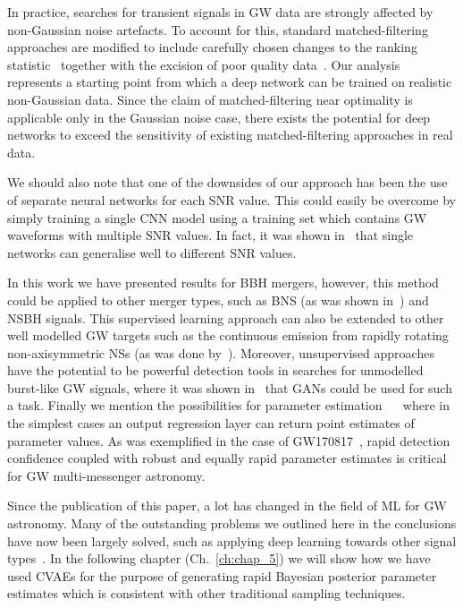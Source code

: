 %
%
In practice, searches for transient signals in \ac{GW} data are strongly 
affected by non-Gaussian noise artefacts. To account for this, 
standard matched-filtering approaches are modified to include 
carefully chosen changes to the ranking
statistic~\cite{PhysRevD.71.062001,0004-637X-849-2-118} together with 
the excision of poor quality data~\cite{1710.02185, 0264-9381-33-13-134001}. 
Our analysis represents a starting point from which a deep network 
can be trained on realistic non-Gaussian data. Since the 
claim of matched-filtering near optimality is applicable only in the 
Gaussian noise case, there exists the potential for deep networks 
to exceed the sensitivity of existing matched-filtering 
approaches in real data.

%
%
We should also note that one of the downsides of our 
approach has been the use of separate 
neural networks for each \ac{SNR} value. This could easily 
be overcome by simply training a single \ac{CNN} model using a training set 
which contains \ac{GW} waveforms with multiple \ac{SNR} values. In fact, 
it was shown in~\cite{PhysRevD.100.044009} that single networks can generalise 
well to different \ac{SNR} values. 

%
%
In this work we have presented results for \ac{BBH} mergers, however, 
this method could be applied to other merger types, such as 
\ac{BNS} (as was shown in~\cite{PhysRevD.102.063015,KRASTEV2020135330}) 
and \ac{NSBH} signals. 
This supervised learning approach can 
also be extended to other well modelled \ac{GW} targets such as the 
continuous emission from rapidly rotating non-axisymmetric \ac{NS}s (as 
was done by~\cite{PhysRevD.100.044009}). Moreover, unsupervised 
approaches have the potential to be powerful detection tools in 
searches for unmodelled burst-like \ac{GW} signals, where it was 
shown in~\cite{2021CQGra..38o5005M} that \acp{GAN} could be 
used for such a task. Finally we 
mention the possibilities for parameter estimation~\cite{GEORGE201864}
~ where 
in the simplest cases an output regression layer can return 
point estimates of parameter values. As was exemplified in the 
case of GW170817~\cite{PhysRevLett.119.161101}, rapid detection confidence 
coupled with robust and equally rapid parameter estimates is 
critical for \ac{GW} multi-messenger astronomy. 

%
%
Since the publication of this paper, a lot has changed in the field of 
\ac{ML} for \ac{GW} astronomy. Many of the outstanding problems we outlined 
here in the conclusions have now been largely solved, such as applying 
deep learning towards other signal types~\cite{KRASTEV2020135330,PhysRevD.102.063015,2021CQGra..38o5005M,2021arXiv210513664B,Cuoco_2020}.
In the following chapter 
(Ch.~\ref{ch:chap_5}) we will show how we have used \acp{CVAE} for the purpose 
of generating rapid Bayesian posterior parameter estimates which is 
consistent with other traditional sampling techniques. 

